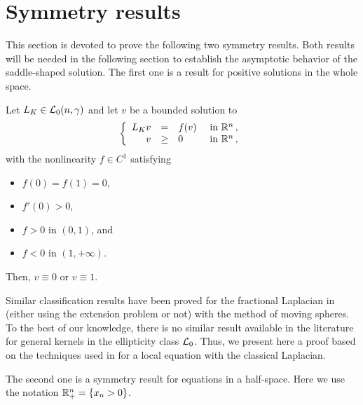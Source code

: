 \section{Symmetry results}
\label{Sec:SymmetryResults}




This section is devoted to prove the following two symmetry results. Both results will be needed in
the following section to establish the asymptotic behavior of the saddle-shaped solution. The first
one is a result for positive solutions in the whole space.

\begin{theorem}
	\label{Th:SymmetryWholeSpace}
	Let $L_K \in \mathcal{L}_0(n,\gamma)$ and let $v$ be a bounded solution to
	\begin{equation}
	\label{Eq:PositiveWholeSpace}
	\left\{\begin{array}{rcll}
	L_K v &=& f(v) & \textrm{ in }\mathbb{R}^n\,,\\
	v &\geq& 0 & \textrm{ in } \mathbb{R}^n\,,
	\end{array} \right.
	\end{equation}
	with the nonlinearity $f\in C^1$ satisfying
	\begin{itemize}
		\item $f(0) = f(1) = 0$,
		\item $f'(0)>0$,
		\item $f>0$ in $(0,1)$, and
		\item $f<0$ in $(1,+\infty)$.
	\end{itemize}
	Then, $v\equiv 0$ or $v \equiv 1$.
\end{theorem}

Similar classification results have been proved for the fractional Laplacian in \cite{LiZhang,ChenLiZhang} (either using the extension problem or not) with the method of moving spheres. To the best of our knowledge, there is no similar result available in the literature for general kernels in the ellipticity class $\mathcal{L}_0$. Thus, we present here a proof based on the techniques used in \cite{BerestyckiHamelNadi} for a local equation with the classical Laplacian.

The second one is a symmetry result for equations in a half-space. Here we use the notation $\mathbb{R}^n_+= \{x_n > 0\}$.

